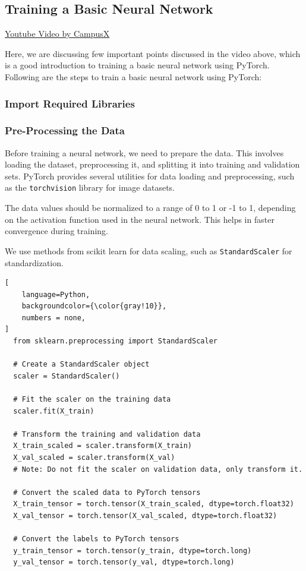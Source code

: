 \documentclass[12pt, a4paper]{article}
\begin{document}
\subsection{Training a Basic Neural Network}
\href{https://youtu.be/MKxEbbKpL5Q?si=rq2xCbflcuIfhI3e}{Youtube Video by CampusX}

Here, we are discussing few important points discussed in the video above, which is a good introduction to training a basic neural network using PyTorch.
Following are the steps to train a basic neural network using PyTorch:

\subsubsection{Import Required Libraries}

\subsubsection{Pre-Processing the Data}

Before training a neural network, we need to prepare the data. This involves loading the dataset, preprocessing it, and splitting it into training and validation sets. PyTorch provides several utilities for data loading and preprocessing, such as the \texttt{torchvision} library for image datasets.

\vspace{0.5em}

The data values should be normalized to a range of 0 to 1 or -1 to 1, depending on the activation function used in the neural network. This helps in faster convergence during training.

We use methods from scikit learn for data scaling, such as \texttt{StandardScaler} for standardization. 

\begin{lstlisting}[
    language=Python,
    backgroundcolor={\color{gray!10}},
    numbers = none,
]
  from sklearn.preprocessing import StandardScaler

  # Create a StandardScaler object
  scaler = StandardScaler()

  # Fit the scaler on the training data
  scaler.fit(X_train)

  # Transform the training and validation data
  X_train_scaled = scaler.transform(X_train)
  X_val_scaled = scaler.transform(X_val)
  # Note: Do not fit the scaler on validation data, only transform it.

  # Convert the scaled data to PyTorch tensors
  X_train_tensor = torch.tensor(X_train_scaled, dtype=torch.float32)
  X_val_tensor = torch.tensor(X_val_scaled, dtype=torch.float32)

  # Convert the labels to PyTorch tensors
  y_train_tensor = torch.tensor(y_train, dtype=torch.long)
  y_val_tensor = torch.tensor(y_val, dtype=torch.long)
\end{lstlisting}
\end{document}
